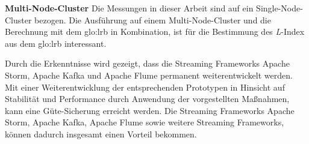 \textbf{Multi-Node-Cluster}
Die Messungen in dieser Arbeit sind auf ein Single-Node-Cluster bezogen. Die Ausführung auf einem Multi-Node-Cluster und die Berechnung mit dem \gls{glo:lrb} in Kombination, ist für die Bestimmung des \textit{L}-Index aus dem \gls{glo:lrb} interessant.

Durch die Erkenntnisse wird gezeigt, dass die Streaming Frameworks Apache Storm, Apache Kafka und Apache Flume permanent weiterentwickelt werden. Mit einer Weiterentwicklung der entsprechenden Prototypen in Hinsicht auf Stabilität und Performance durch Anwendung der vorgestellten Maßnahmen, kann eine Güte-Sicherung erreicht werden. Die Streaming Frameworks Apache Storm, Apache Kafka, Apache Flume sowie weitere Streaming Frameworks, können dadurch insgesamt einen Vorteil bekommen.
